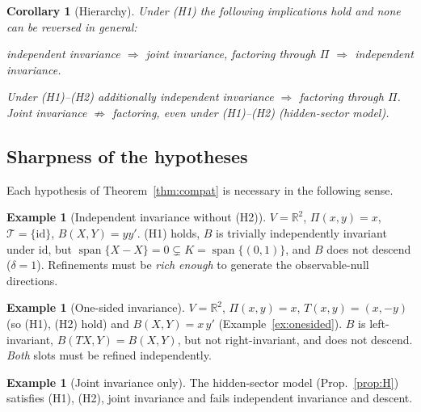 \documentclass[11pt,a4paper]{article}
\newcommand{\RR}{\mathbb{R}}
\newcommand{\spn}{\operatorname{span}}
\newcommand{\id}{\mathrm{id}}
\newcommand{\defic}{\delta}
\theoremstyle{plain}
\newtheorem{corollary}[theorem]{Corollary}
\theoremstyle{definition}
\newtheorem{example}[theorem]{Example}
\begin{document}
\begin{corollary}[Hierarchy]\label{cor:hier}
Under (H1) the following implications hold and none can be reversed in general:
\begin{center}
independent invariance $\Longrightarrow$ joint invariance, \qquad factoring through $\Pi$ $\Longrightarrow$ independent invariance.
\end{center}
Under (H1)--(H2) additionally independent invariance $\Longrightarrow$ factoring through $\Pi$. Joint invariance $\not\Longrightarrow$ factoring, even under (H1)--(H2) (hidden-sector model).
\end{corollary}

\subsection{Sharpness of the hypotheses}\label{sec:sharp}
Each hypothesis of Theorem~\ref{thm:compat} is necessary in the following sense.
\begin{example}[Independent invariance without (H2)]\label{ex:noH2}
$V=\RR^2$, $\Pi(x,y)=x$, $\mathcal T=\{\id\}$, $B(X,Y)=yy'$. (H1) holds, $B$ is trivially independently invariant under $\id$, but $\spn\{X-X\}=0\subsetneq K=\spn\{(0,1)\}$, and $B$ does not descend ($\defic=1$). Refinements must be \emph{rich enough} to generate the observable-null directions.
\end{example}
\begin{example}[One-sided invariance]\label{ex:oneside}
$V=\RR^2$, $\Pi(x,y)=x$, $T(x,y)=(x,-y)$ (so (H1), (H2) hold) and $B(X,Y)=x\,y'$ (Example~\ref{ex:onesided}). $B$ is left-invariant, $B(TX,Y)=B(X,Y)$, but not right-invariant, and does not descend. \emph{Both} slots must be refined independently.
\end{example}
\begin{example}[Joint invariance only]
The hidden-sector model (Prop.~\ref{prop:H}) satisfies (H1), (H2), joint invariance and fails independent invariance and descent.
\end{example}
\end{document}
